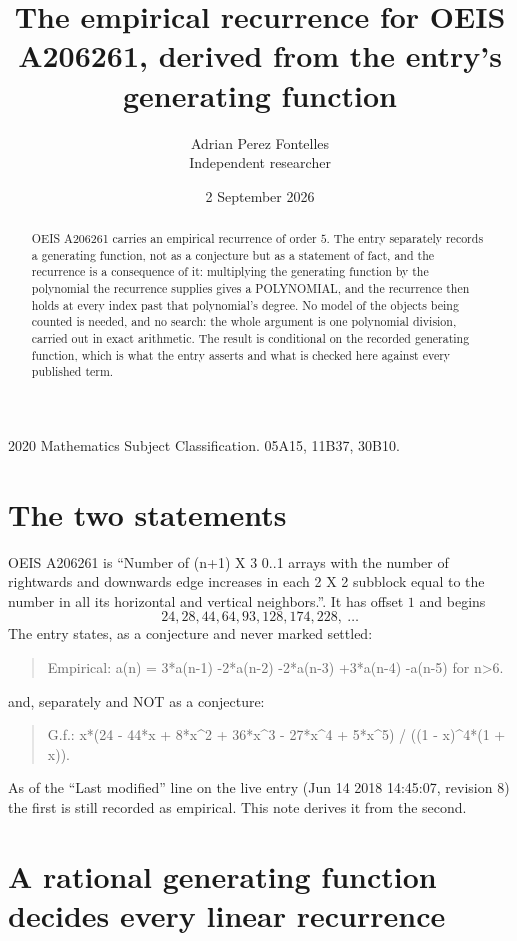 \documentclass[11pt,a4paper]{article}
\title{The empirical recurrence for OEIS A206261, derived from the entry's generating function}
\author{Adrian Perez Fontelles\\ \small Independent researcher}
\date{2 September 2026}
\theoremstyle{plain}
\theoremstyle{definition}
\begin{document}
\maketitle

\begin{abstract}
OEIS A206261 carries an empirical recurrence of order $5$. The entry separately records a
generating function, not as a conjecture but as a statement of fact, and the recurrence is a
consequence of it: multiplying the generating function by the polynomial the recurrence
supplies gives a POLYNOMIAL, and the recurrence then holds at every index past that
polynomial's degree. No model of the objects being counted is needed, and no search: the
whole argument is one polynomial division, carried out in exact arithmetic. The result is
conditional on the recorded generating function, which is what the entry asserts and what is
checked here against every published term.
\end{abstract}

\noindent\small 2020 Mathematics Subject Classification. 05A15, 11B37, 30B10.\normalsize

\section{The two statements}

OEIS A206261 is ``Number of (n+1) X 3 0..1 arrays with the number of rightwards and downwards edge increases in each 2 X 2 subblock equal to the number in all its horizontal and vertical neighbors.''. It has offset $1$ and begins
\[
24, 28, 44, 64, 93, 128, 174, 228,\ \dots
\]
The entry states, as a conjecture and never marked settled:
\begin{quote}
Empirical: a(n) = 3*a(n-1) -2*a(n-2) -2*a(n-3) +3*a(n-4) -a(n-5) for n>6.
\end{quote}
and, separately and NOT as a conjecture:
\begin{quote}
G.f.: x*(24 - 44*x + 8*x\^{}2 + 36*x\^{}3 - 27*x\^{}4 + 5*x\^{}5) / ((1 - x)\^{}4*(1 + x)).
\end{quote}
As of the ``Last modified'' line on the live entry (Jun 14 2018 14:45:07, revision 8) the first is still
recorded as empirical. This note derives it from the second.

\section{A rational generating function decides every linear recurrence}
\end{document}

